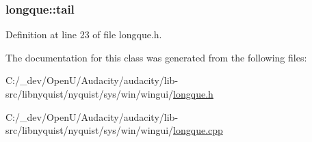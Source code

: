 \subsubsection[{\texorpdfstring{tail}{tail}}]{ longque\+::tail\hspace{0.3cm}{\ttfamily [protected]}}\hypertarget{classlongque_a766b1fa9835660ed70e7377cfa9f3209}{}\label{classlongque_a766b1fa9835660ed70e7377cfa9f3209}


Definition at line 23 of file longque.\+h.



The documentation for this class was generated from the following files\+:\begin{DoxyCompactItemize}
\item 
C\+:/\+\_\+dev/\+Open\+U/\+Audacity/audacity/lib-\/src/libnyquist/nyquist/sys/win/wingui/\hyperlink{longque_8h}{longque.\+h}\item 
C\+:/\+\_\+dev/\+Open\+U/\+Audacity/audacity/lib-\/src/libnyquist/nyquist/sys/win/wingui/\hyperlink{longque_8cpp}{longque.\+cpp}\end{DoxyCompactItemize}
